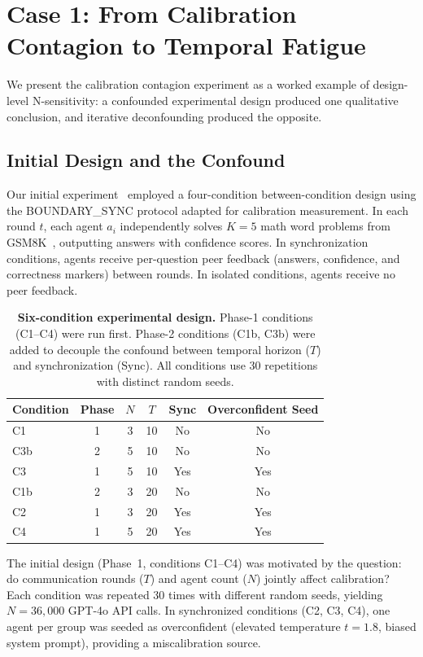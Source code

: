 \documentclass[11pt]{article}
\begin{document}
\section{Case 1: From Calibration Contagion to Temporal Fatigue}
\label{sec:case1}

We present the calibration contagion experiment as a worked example of design-level N-sensitivity: a confounded experimental design produced one qualitative conclusion, and iterative deconfounding produced the opposite.

\subsection{Initial Design and the Confound}

Our initial experiment~\cite{liu2026calibrationcontagion} employed a four-condition between-condition design using the BOUNDARY\_SYNC protocol adapted for calibration measurement. In each round $t$, each agent $a_i$ independently solves $K{=}5$ math word problems from GSM8K~\cite{cobbe2021gsm8k}, outputting answers with confidence scores. In synchronization conditions, agents receive per-question peer feedback (answers, confidence, and correctness markers) between rounds. In isolated conditions, agents receive no peer feedback.

\begin{table}[t]
\centering
\caption{\textbf{Six-condition experimental design.} Phase-1 conditions (C1--C4) were run first. Phase-2 conditions (C1b, C3b) were added to decouple the confound between temporal horizon ($T$) and synchronization (Sync). All conditions use 30 repetitions with distinct random seeds.}
\label{tab:design}
\begin{tabular}{lccccc}
\toprule
Condition & Phase & $N$ & $T$ & Sync & Overconfident Seed \\
\midrule
C1  & 1 & 3 & 10 & No  & No  \\
C3b & 2 & 5 & 10 & No  & No  \\
C3  & 1 & 5 & 10 & Yes & Yes \\
\midrule
C1b & 2 & 3 & 20 & No  & No  \\
C2  & 1 & 3 & 20 & Yes & Yes \\
C4  & 1 & 5 & 20 & Yes & Yes \\
\bottomrule
\end{tabular}
\end{table}

The initial design (Phase~1, conditions C1--C4) was motivated by the question: do communication rounds ($T$) and agent count ($N$) jointly affect calibration? Each condition was repeated 30 times with different random seeds, yielding $N = 36{,}000$ GPT-4o API calls. In synchronized conditions (C2, C3, C4), one agent per group was seeded as overconfident (elevated temperature $t{=}1.8$, biased system prompt), providing a miscalibration source.
\end{document}
